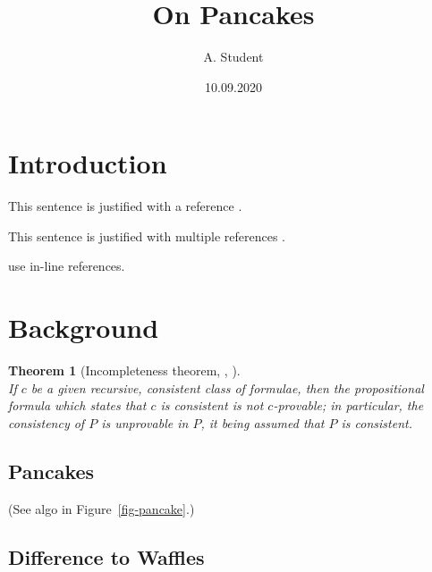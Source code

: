 \documentclass{article}
\author{A. Student}
\title{On Pancakes}
\date{10.09.2020}
\newtheorem{theorem}{Theorem}
\begin{document}
\maketitle

\begin{abstract}
  \lipsum[1]
\end{abstract}

\section{Introduction}
This sentence is justified with a reference \citep{hofstadter-1979}.

This sentence is justified with multiple references \citep{hofstadter-1979,godel-mmp1931,prusinkiewicz-csiro1996}.

\citet{prusinkiewicz-csiro1996} use in-line references.

\lipsum[4]

\section{Background}

\lipsum[1]
\begin{theorem}[Incompleteness theorem, \citeauthor{godel-mmp1931}, \citeyear{godel-mmp1931}]~\\
    If $c$ be a given recursive, consistent class of formulae, then the
    propositional formula which states that $c$ is consistent is not
    $c$-provable; in particular, the consistency of $P$ is unprovable in $P$, it
    being assumed that $P$ is consistent.
\end{theorem}

\subsection{Pancakes}

\lipsum[3]
(See algo in Figure~\ref{fig-pancake}.)


\subsection{Difference to Waffles}
\lipsum[2]




\end{document}
